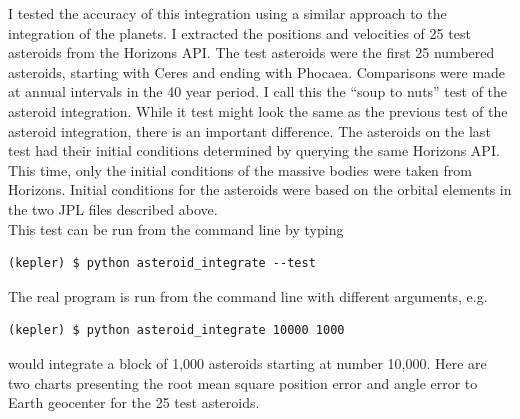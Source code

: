 I tested the accuracy of this integration using a similar approach to the integration of the planets.
I extracted the positions and velocities of 25 test asteroids from the Horizons API.
The test asteroids were the first 25 numbered asteroids, starting with Ceres and ending with Phocaea.
Comparisons were made at annual intervals in the 40 year period.
I call this the ``soup to nuts'' test of the asteroid integration.
While it test might look the same as the previous test of the asteroid integration, there is an important difference.
The asteroids on the last test had their initial conditions determined by querying the same Horizons API.
This time, only the initial conditions of the massive bodies were taken from Horizons.
Initial conditions for the asteroids were based on the orbital elements in the two JPL files described above.\\
This test can be run from the command line by typing
\begin{lstlisting}[style=CodeSnippet]
(kepler) $ python asteroid_integrate --test
\end{lstlisting}
The real program is run from the command line with different arguments, e.g. 
\begin{lstlisting}[style=CodeSnippet]
(kepler) $ python asteroid_integrate 10000 1000
\end{lstlisting}
would integrate a block of 1,000 asteroids starting at number 10,000. 
Here are two charts presenting the root mean square position error and angle error to Earth geocenter for the 25 test asteroids.
